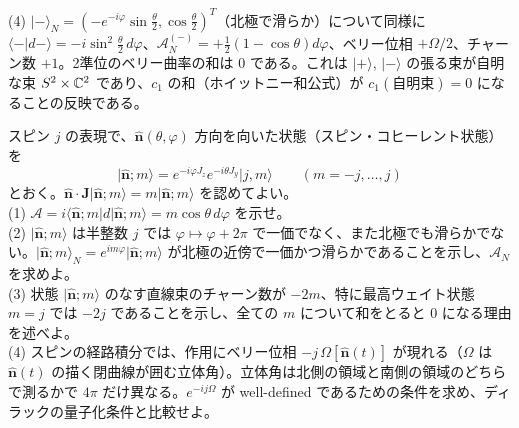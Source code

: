\begin{solution}
(4) $\lvert-\rangle_N=(-e^{-i\varphi}\sin\frac\theta2,\cos\frac\theta2)^T$（北極で滑らか）について同様に $\langle-|d-\rangle=-i\sin^2\frac\theta2\,d\varphi$、$\mathcal A^{(-)}_N=+\frac12(1-\cos\theta)d\varphi$、ベリー位相 $+\Omega/2$、チャーン数 $+1$。2準位のベリー曲率の和は $0$ である。これは $\lvert+\rangle$, $\lvert-\rangle$ の張る束が自明な束 $S^2\times\mathbb{C}^2$ であり、$c_1$ の和（ホイットニー和公式）が $c_1(\text{自明束})=0$ になることの反映である。
\end{solution}

\begin{problem}[難易度 C]\label{ch08-prob-spinj}
スピン $j$ の表現で、$\hat{\bm n}(\theta,\varphi)$ 方向を向いた状態（スピン・コヒーレント状態）を
\[
\lvert\hat{\bm n};m\rangle=e^{-i\varphi J_z}e^{-i\theta J_y}\lvert j,m\rangle\qquad(m=-j,\dots,j)
\]
とおく。$\hat{\bm n}\cdot\bm J\lvert\hat{\bm n};m\rangle=m\lvert\hat{\bm n};m\rangle$ を認めてよい。\\
(1) $\mathcal A=i\langle\hat{\bm n};m|d|\hat{\bm n};m\rangle=m\cos\theta\,d\varphi$ を示せ。\\
(2) $\lvert\hat{\bm n};m\rangle$ は半整数 $j$ では $\varphi\mapsto\varphi+2\pi$ で一価でなく、また北極でも滑らかでない。$\lvert\hat{\bm n};m\rangle_N=e^{im\varphi}\lvert\hat{\bm n};m\rangle$ が北極の近傍で一価かつ滑らかであることを示し、$\mathcal A_N$ を求めよ。\\
(3) 状態 $\lvert\hat{\bm n};m\rangle$ のなす直線束のチャーン数が $-2m$、特に最高ウェイト状態 $m=j$ では $-2j$ であることを示し、全ての $m$ について和をとると $0$ になる理由を述べよ。\\
(4) スピンの経路積分では、作用にベリー位相 $-j\,\Omega[\hat{\bm n}(t)]$ が現れる（$\Omega$ は $\hat{\bm n}(t)$ の描く閉曲線が囲む立体角）。立体角は北側の領域と南側の領域のどちらで測るかで $4\pi$ だけ異なる。$e^{-ij\Omega}$ が well-defined であるための条件を求め、ディラックの量子化条件と比較せよ。
\end{problem}

